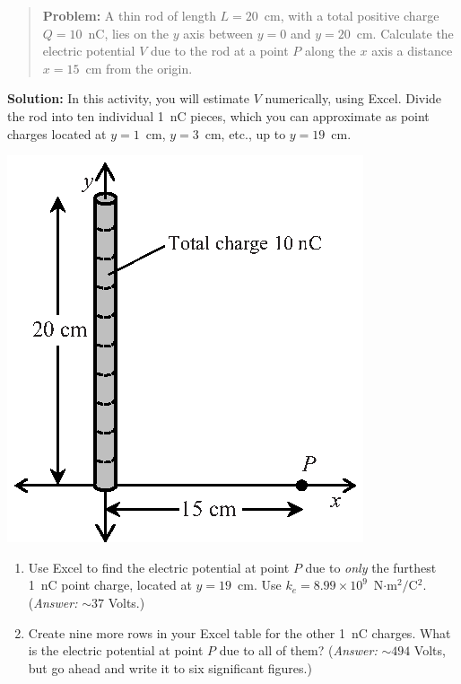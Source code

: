 \begin{minipage}{0.64\textwidth}
\begin{quote}
\textbf{Problem:} A thin rod of length $L=20$~cm, with a total positive charge $Q=10$~nC, lies on the $y$ axis between $y=0$ and $y=20$~cm.  Calculate the electric potential $V$ due to the rod at a point $P$ along the $x$ axis a distance $x=15$~cm from the origin. 
\end{quote}

\textbf{Solution:} In this activity, you will estimate $V$ numerically, using Excel.  Divide the rod into ten individual 1~nC pieces, which you can approximate as point charges located at $y=1$~cm, $y=3$~cm, etc., up to $y=19$~cm.  
\end{minipage}
\begin{minipage}{0.35\textwidth}
\vspace{-0.3in}
\raggedleft \includegraphics[scale=0.9]{potential_charge_distributions/rod_axes.eps}
\end{minipage}

\begin{enumerate}[wide, label=(\emph{\alph*})]

\item Use Excel to find the electric potential at point $P$ due to \textit{only} the furthest 1~nC point charge, located at $y=19$~cm.  Use $k_e=8.99 \times 10^9$~N$\cdot$m$^2/$C$^2$.  (\textit{Answer:} $\sim 37$ Volts.)
\answerspace{0.5in}

\item Create nine more rows in your Excel table for the other 1~nC charges.  What is the electric potential at point $P$ due to all of them?  (\textit{Answer:} $\sim 494$ Volts, but go ahead and write it to six significant figures.) 
\answerspace{0.5in}

\end{enumerate}


